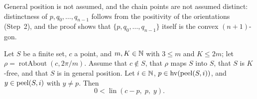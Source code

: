 \begin{remark}
General position is not assumed, and the chain points are not assumed distinct: distinctness of $p,q_0,\dots,q_{n-1}$
follows from the positivity of the orientations (Step~2), and the proof shows that $\{p,q_0,\dots,q_{n-1}\}$ itself is
the convex $(n+1)$-gon.
\end{remark}

\begin{lemma}\label{lg:lem:halfplane}
Let $S$ be a finite set, $c$ a point, and $m,K\in\mathbb N$ with $3\le m$ and $K\le 2m$; let $\rho=\operatorname{rotAbout}(c,2\pi/m)$.
Assume that $c\notin S$, that $\rho$ maps $S$ into $S$, that $S$ is $K$-free, and that $S$ is in general position. Let
$i\in\mathbb N$, $p\in\operatorname{hv}(\operatorname{peel}(S,i))$, and $y\in\operatorname{peel}(S,i)$ with $y\ne p$. Then
\[
  0<\operatorname{lin}(c-p,\;p,\;y).
\]
\end{lemma}

